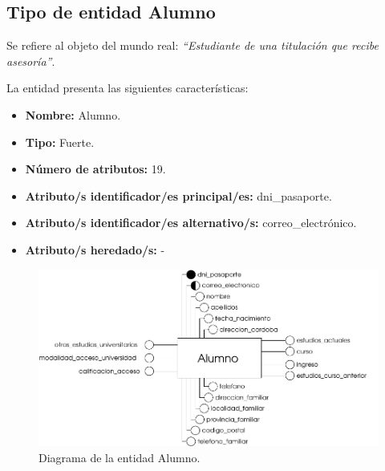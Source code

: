 \subsection{Tipo de entidad Alumno}

   \begin{description}

   \item[Definición] Se refiere al objeto del mundo real: \emph{``Estudiante de
        una titulación que recibe asesoría''}.

   \item[Características] La entidad presenta las siguientes características:
      \begin{itemize}
         \item \textbf{Nombre:} Alumno.
         \item \textbf{Tipo:} Fuerte.
         \item \textbf{Número de atributos:} 19.
         \item \textbf{Atributo/s identificador/es principal/es:} dni\_pasaporte.
         \item \textbf{Atributo/s identificador/es alternativo/s:} correo\_electrónico.
         \item \textbf{Atributo/s heredado/s:} -
      \end{itemize}

   \item[Diagrama]
   \item \begin{figure}[h!]
            \begin{center}
            \includegraphics[]{07.Modelo_Entidad-Interrelacion/7.2.Analisis_Entidades/diagramas/alumno.pdf}
            \caption{Diagrama de la entidad Alumno.}
            \end{center}
         \end{figure}


\end{description}
